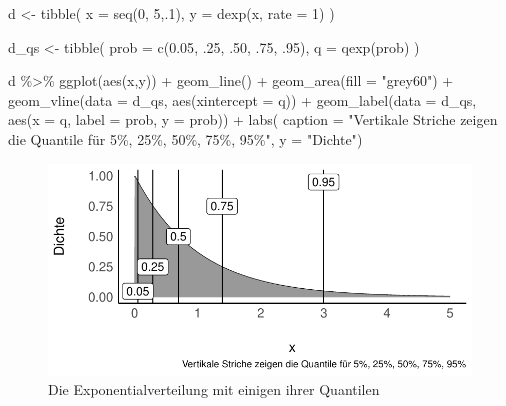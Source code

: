 \documentclass[
  a4paper,
  DIV=11]{scrreprt}
\newenvironment{Shaded}{\begin{snugshade}}{\end{snugshade}}
\newcommand{\AttributeTok}[1]{\textcolor[rgb]{0.40,0.45,0.13}{#1}}
\newcommand{\DecValTok}[1]{\textcolor[rgb]{0.68,0.00,0.00}{#1}}
\newcommand{\FloatTok}[1]{\textcolor[rgb]{0.68,0.00,0.00}{#1}}
\newcommand{\FunctionTok}[1]{\textcolor[rgb]{0.28,0.35,0.67}{#1}}
\newcommand{\NormalTok}[1]{\textcolor[rgb]{0.00,0.23,0.31}{#1}}
\newcommand{\OtherTok}[1]{\textcolor[rgb]{0.00,0.23,0.31}{#1}}
\newcommand{\SpecialCharTok}[1]{\textcolor[rgb]{0.37,0.37,0.37}{#1}}
\newcommand{\StringTok}[1]{\textcolor[rgb]{0.13,0.47,0.30}{#1}}
\theoremstyle{definition}
\theoremstyle{remark}
\begin{document}
\begin{Shaded}
\begin{Highlighting}[]
\NormalTok{d }\OtherTok{\textless{}{-}}
  \FunctionTok{tibble}\NormalTok{(}
    \AttributeTok{x =} \FunctionTok{seq}\NormalTok{(}\DecValTok{0}\NormalTok{, }\DecValTok{5}\NormalTok{,.}\DecValTok{1}\NormalTok{),}
    \AttributeTok{y =} \FunctionTok{dexp}\NormalTok{(x, }\AttributeTok{rate =} \DecValTok{1}\NormalTok{)}
\NormalTok{  )}


\NormalTok{d\_qs }\OtherTok{\textless{}{-}}
  \FunctionTok{tibble}\NormalTok{(}
    \AttributeTok{prob =} \FunctionTok{c}\NormalTok{(}\FloatTok{0.05}\NormalTok{, .}\DecValTok{25}\NormalTok{, .}\DecValTok{50}\NormalTok{, .}\DecValTok{75}\NormalTok{, .}\DecValTok{95}\NormalTok{),}
    \AttributeTok{q =} \FunctionTok{qexp}\NormalTok{(prob) }
\NormalTok{  )}

\NormalTok{d }\SpecialCharTok{\%\textgreater{}\%} 
  \FunctionTok{ggplot}\NormalTok{(}\FunctionTok{aes}\NormalTok{(x,y)) }\SpecialCharTok{+}
  \FunctionTok{geom\_line}\NormalTok{() }\SpecialCharTok{+}
  \FunctionTok{geom\_area}\NormalTok{(}\AttributeTok{fill =} \StringTok{"grey60"}\NormalTok{) }\SpecialCharTok{+}
  \FunctionTok{geom\_vline}\NormalTok{(}\AttributeTok{data =}\NormalTok{ d\_qs,}
             \FunctionTok{aes}\NormalTok{(}\AttributeTok{xintercept =}\NormalTok{ q)) }\SpecialCharTok{+}
  \FunctionTok{geom\_label}\NormalTok{(}\AttributeTok{data =}\NormalTok{ d\_qs,}
             \FunctionTok{aes}\NormalTok{(}\AttributeTok{x =}\NormalTok{ q, }
                 \AttributeTok{label =}\NormalTok{ prob,}
                 \AttributeTok{y =}\NormalTok{ prob)) }\SpecialCharTok{+}
  \FunctionTok{labs}\NormalTok{(}
       \AttributeTok{caption =} \StringTok{"Vertikale Striche zeigen die Quantile für 5\%, 25\%, 50\%, 75\%, 95\%"}\NormalTok{,}
       \AttributeTok{y =} \StringTok{"Dichte"}\NormalTok{)}
\end{Highlighting}
\end{Shaded}

\begin{figure}[H]

{\centering \includegraphics{./gauss_files/figure-pdf/fig-exp-1.pdf}

}

\caption{\label{fig-exp}Die Exponentialverteilung mit einigen ihrer
Quantilen}

\end{figure}
\end{document}
